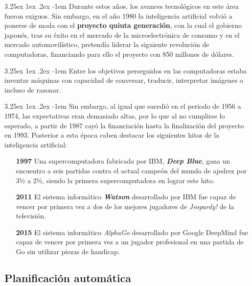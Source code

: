 \documentclass{article}
\makeatletter
\renewcommand\paragraph{\@startsection{paragraph}{5}{\z@}%
      {3.25ex \@plus1ex \@minus.2ex}%
      {-1em}%
      {\normalfont\normalsize\bfseries}}
\makeatother
\begin{document}
    \paragraph{}
    Durante estos años, los avances tecnológicos en este área fueron exiguos. Sin embargo, en el año 1980 la inteligencia artificial volvió a ponerse de moda con el     \textbf{proyecto quinta generación}, con la cual el gobierno japonés, tras su éxito en el mercado de la microelectrónica de consumo y en el mercado automovilístico, pretendía liderar la siguiente revolución de computadoras, financiando para ello el proyecto con 850 millones de dólares.
    
    \paragraph{}
    Entre los objetivos perseguidos en las computadoras estaba inventar máquinas con capacidad de conversar, traducir, interpretar imágenes o incluso de razonar.
    
    \paragraph{}
    Sin embargo, al igual que sucedió en el periodo de 1956 a 1974, las expectativas eran demasiado altas, por lo que al no cumplirse lo esperado, a partir de 1987 cayó la financiación hasta la finalización del proyecto en 1993. Posterior a esta época caben destacar los siguientes hitos de la inteligencia artificial:
    
    \begin{itemize}
        \item[\textbf{1997}] Una supercomputadora fabricada por IBM, \textit{\textbf{Deep Blue}}, gana un encuentro a seis partidas contra el actual campeón del mundo de ajedrez por 3½ a 2½, siendo la primera supercomputadora en lograr este hito\cite{deepBlue}.
        \item[\textbf{2011}] El sistema informático \textit{\textbf{Watson}} desarrollado por IBM fue capaz de vencer por primera vez a dos de los mejores jugadores de \textit{Jeopardy!} de la televisión\cite{jeopardy}.
        \item[\textbf{2015}] El sistema informático \textit{AlphaGo} desarrollado por Google DeepMind fue capaz de vencer por primera vez a un jugador profesional en una partida de Go sin utilizar piezas de handicap\cite{go}.
    \end{itemize}
    
        \subsection{Planificación automática}
        
\end{document}
